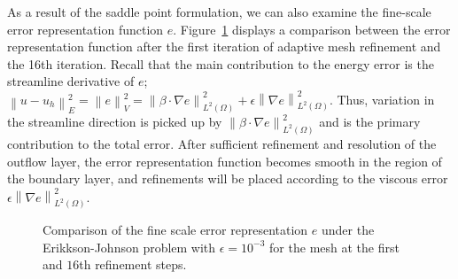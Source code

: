 \documentclass[final,leqno]{siamltex}
\newcommand{\nor}[1]{\left\| #1 \right\|}
\newcommand{\LRp}[1]{\left( #1 \right)}
\newcommand{\Grad} {\ensuremath{\nabla}}
\renewcommand{\L}{L^2\LRp{\Omega}}
\begin{document}
As a result of the saddle point formulation, we can also examine the fine-scale error representation function $e$.  Figure~\ref{fig:erikksonError} displays a comparison between the error representation function after the first iteration of adaptive mesh refinement and the 16th iteration.  Recall that the main contribution to the energy error is the streamline derivative of $e$; $\nor{u-u_h}_E^2 = \nor{e}_V^2 = \nor{\beta \cdot \Grad e}_{\L}^2 + \epsilon\nor{\Grad e}_{\L}^2$. Thus, variation in the streamline direction is picked up by $\nor{\beta\cdot \Grad e}_{\L}^2$ and is the primary contribution to the total error.  After sufficient refinement and resolution of the outflow layer, the error representation function becomes smooth in the region of the boundary layer, and refinements will be placed according to the viscous error $\epsilon\nor{\Grad e}_{\L}^2$. 

\begin{figure}[!h]
\centering
{}
\caption{Comparison of the fine scale error representation $e$ under the Erikkson-Johnson problem with $\epsilon = 10^{-3}$ for the mesh at the first and $16$th refinement steps.}
\label{fig:erikksonError}
\end{figure}
\end{document}
